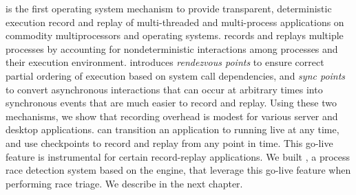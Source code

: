 \scribe is the first operating system mechanism to provide transparent,
deterministic execution record and replay of multi-threaded and multi-process
applications on commodity multiprocessors and operating systems. \scribe records
and replays multiple processes by accounting for nondeterministic interactions
among processes and their execution environment.  \scribe introduces {\em
rendezvous points} to ensure correct partial ordering of execution based on
system call dependencies, and {\em sync points} to convert asynchronous
interactions that can occur at arbitrary times into synchronous events that are
much easier to record and replay.
Using these two mechanisms, we show that \scribe{} recording overhead is modest
for various server and desktop applications.
\scribe can transition an application to running live at any time, and use
checkpoints to record and replay from any point in time.
This go-live feature is instrumental for certain record-replay applications. We
built \racepro, a process race detection system based on the \scribe engine,
that leverage this go-live feature when performing race triage. We describe
\racepro in the next chapter.
